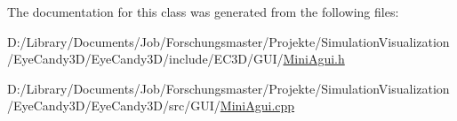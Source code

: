 The documentation for this class was generated from the following files\+:\begin{DoxyCompactItemize}
\item 
D\+:/\+Library/\+Documents/\+Job/\+Forschungsmaster/\+Projekte/\+Simulation\+Visualization/\+Eye\+Candy3\+D/\+Eye\+Candy3\+D/include/\+E\+C3\+D/\+G\+U\+I/\mbox{\hyperlink{_mini_agui_8h}{Mini\+Agui.\+h}}\item 
D\+:/\+Library/\+Documents/\+Job/\+Forschungsmaster/\+Projekte/\+Simulation\+Visualization/\+Eye\+Candy3\+D/\+Eye\+Candy3\+D/src/\+G\+U\+I/\mbox{\hyperlink{_mini_agui_8cpp}{Mini\+Agui.\+cpp}}\end{DoxyCompactItemize}
